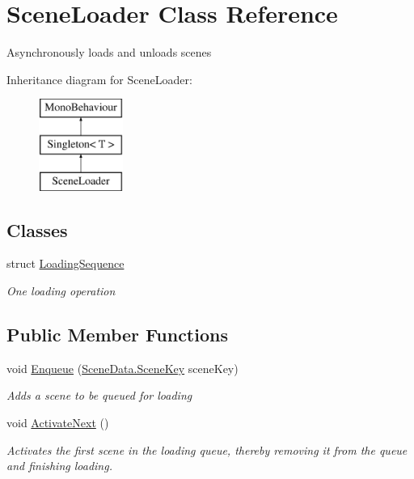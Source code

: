 \hypertarget{class_scene_loader}{\section{Scene\-Loader Class Reference}
\label{class_scene_loader}
}


Asynchronously loads and unloads scenes  


Inheritance diagram for Scene\-Loader\-:\begin{figure}[H]
\begin{center}
\leavevmode
\includegraphics[height=3.000000cm]{class_scene_loader}
\end{center}
\end{figure}
\subsection*{Classes}
\begin{DoxyCompactItemize}
\item 
struct \hyperlink{struct_scene_loader_1_1_loading_sequence}{Loading\-Sequence}
\begin{DoxyCompactList}\small\item\em One loading operation \end{DoxyCompactList}\end{DoxyCompactItemize}
\subsection*{Public Member Functions}
\begin{DoxyCompactItemize}
\item 
void \hyperlink{class_scene_loader_a9e0efaf19ed0a6ffbf11a8372794ea56}{Enqueue} (\hyperlink{class_scene_data_a79d397b3deef242a865470283d96f2e6}{Scene\-Data.\-Scene\-Key} scene\-Key)
\begin{DoxyCompactList}\small\item\em Adds a scene to be queued for loading \end{DoxyCompactList}\item 
void \hyperlink{class_scene_loader_a8d34c08688d084324ae9c3f52c1a7c18}{Activate\-Next} ()
\begin{DoxyCompactList}\small\item\em Activates the first scene in the loading queue, thereby removing it from the queue and finishing loading. \end{DoxyCompactList}\end{DoxyCompactItemize}
